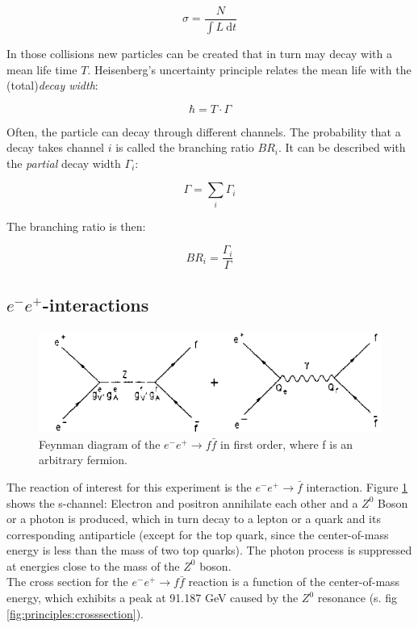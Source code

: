 \begin{equation}
\sigma = \frac{N}{\int L~\text{d}t}
\end{equation}

In those collisions new particles can be created that in turn may decay with a mean life time $T$.
Heisenberg's uncertainty principle relates the mean life with the (total)\emph{decay width}:

\begin{equation}
\hbar=T\cdot\Gamma
\end{equation}

Often, the particle can decay through different channels. The probability that a decay takes channel $i$ is called the branching ratio $BR_i$. It can be described with the \emph{partial} decay width $\Gamma_i$:

\begin{equation}
\Gamma = \sum_i \Gamma_i
\end{equation}

The branching ratio is then:

\begin{equation}
BR_i=\frac{\Gamma_i}{\Gamma}
\label{eq:principles:branching ratio}
\end{equation}

\subsection{$e^-e^+$-interactions}
\label{sec:ee interaction}
\begin{figure}[ht]
	\centering
	\includegraphics{graphics/annihilation.png}
	\caption[Feynman diagramm: $e^-e^+ \rightarrow f\bar{f} $(s-channel)]{Feynman diagram of the $e^-e^+ \rightarrow f\bar{f}$ in first order, where f is an arbitrary fermion.} 
	\label{fig:principles:annihilation.png}
\end{figure}

The reaction of interest for this experiment is the $e^-e^+\rightarrow\bar{f}$ interaction. Figure \ref{fig:principles:annihilation.png} shows the s-channel: Electron and positron annihilate each other and a $Z^0$ Boson or a photon is produced, which in turn decay to a lepton or a quark and its corresponding antiparticle (except for the top quark, since the center-of-mass energy is less than the mass of two top quarks). The photon process is suppressed at energies close to the mass of the $Z^0$ boson\cite{muenchen}.\\%
The cross section for the $e^-e^+\rightarrow f\bar{f}$ reaction is a function of the center-of-mass energy, which exhibits a peak at 91.187 GeV caused by the $Z^0$ resonance (s. fig \ref{fig:principles:crosssection}).

